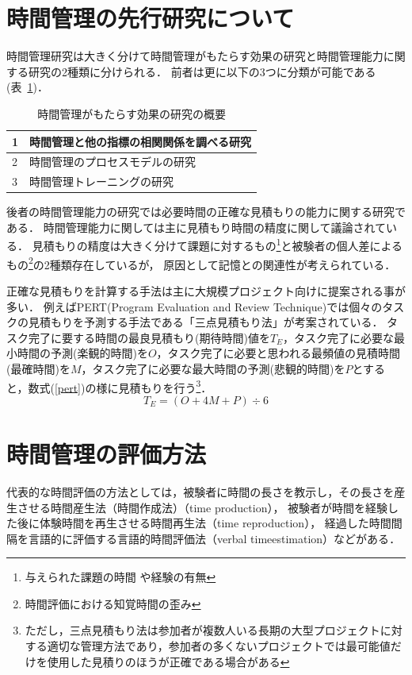 \section{時間管理の先行研究について}
時間管理研究は大きく分けて時間管理がもたらす効果の研究と時間管理能力に関する研究の2種類に分けられる．
前者は更に以下の3つに分類が可能である(表~\ref{tb:senko})．
\begin{table}[htb]
\begin{center}
  \begin{tabular}{|l|l|} \hline
   1 & 時間管理と他の指標の相関関係を調べる研究 \\ \hline
   2 & 時間管理のプロセスモデルの研究 \\ \hline
   3 & 時間管理トレーニングの研究 \\ \hline
  \end{tabular}
  \caption{時間管理がもたらす効果の研究の概要}
  \label{tb:senko}
\end{center}
\end{table}

後者の時間管理能力の研究では必要時間の正確な見積もりの能力に関する研究である．
時間管理能力に関しては主に見積もり時間の精度に関して議論されている．
見積もりの精度は大きく分けて課題に対するもの\footnote{与えられた課題の時間 \cite{Roy2008}や経験の有無\cite{Roy2007}}と被験者の個人差によるもの\footnote{時間評価における知覚時間の歪み\cite{Oguro1961}\cite{Murakami2016}}の2種類存在しているが，
原因として記憶との関連性が考えられている\cite{Roy2005}．

正確な見積もりを計算する手法は主に大規模プロジェクト向けに提案される事が多い．
例えばPERT(Program Evaluation and Review Technique)では個々のタスクの見積もりを予測する手法である「三点見積もり法」が考案されている．
タスク完了に要する時間の最良見積もり(期待時間)値を$T_{E}$，タスク完了に必要な最小時間の予測(楽観的時間)を$O$，タスク完了に必要と思われる最頻値の見積時間(最確時間)を$M$，タスク完了に必要な最大時間の予測(悲観的時間)を$P$とすると，数式(\ref{pert})の様に見積もりを行う\footnote{ただし，三点見積もり法は参加者が複数人いる長期の大型プロジェクトに対する適切な管理方法であり，参加者の多くないプロジェクトでは最可能値だけを使用した見積りのほうが正確である場合がある\cite{Kato1965}}．
\begin{equation}
\label{pert}
T_{E} = (O + 4M + P) ÷ 6
\end{equation}

\section{時間管理の評価方法}
代表的な時間評価の方法としては，被験者に時間の長さを教示し，その長さを産生させる時間産生法（時間作成法）（time production），
被験者が時間を経験した後に体験時間を再生させる時間再生法（time reproduction），
経過した時間間隔を言語的に評価する言語的時間評価法（verbal timeestimation）などがある\cite{Oguro1961}\cite{Tayama2018}．

